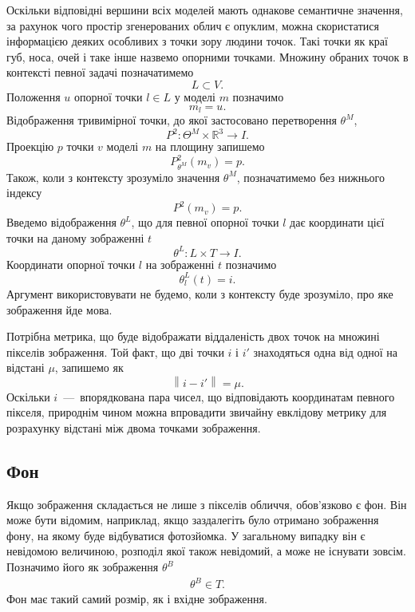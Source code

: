 Оскільки відповідні вершини всіх моделей мають однакове семантичне значення,
за рахунок чого простір згенерованих облич є опуклим,
можна скористатися інформацією деяких особливих з точки зору людини точок.
Такі точки як краї губ, носа, очей і таке інше назвемо опорними точками.
Множину обраних точок в контексті певної задачі позначатимемо
\begin{equation*}
  L \subset V.
\end{equation*}
Положення $u$ опорної точки $l \in L$ у моделі $m$ позначимо
\begin{equation*}
  m_{l} = u.
\end{equation*}
Відображення тривимірної точки,
до якої застосовано перетворення $\theta^M$,
\begin{equation*}
  P^2: \Theta^M \times \mathbb{R}^3 \rightarrow I.
\end{equation*}
Проекцію $p$ точки $v$ моделі $m$ на площину запишемо
\begin{equation*}
  P^2_{\theta^M}\left( m_v \right) = p.
\end{equation*}
Також, коли з контексту зрозуміло значення $\theta^M$,
позначатимемо без нижнього індексу
\begin{equation*}
  P^2\left( m_v \right) = p.
\end{equation*}
Введемо відображення $\theta^L$,
що для певної опорної точки $l$
дає координати цієї точки на даному зображенні $t$
\begin{equation*}
  \theta^L: L \times T \rightarrow I.
\end{equation*}
Координати опорної точки $l$ на зображенні $t$ позначимо
\begin{equation*}
  \theta_l^L\left( t \right) = i.
\end{equation*}
Аргумент використовувати не будемо, коли з контексту буде зрозуміло,
про яке зображення йде мова.

Потрібна метрика,
що буде відображати віддаленість двох точок на множині пікселів зображення.
Той факт,
що дві точки $i$ і $i'$ знаходяться одна від одної на відстані $\mu$,
запишемо як
\begin{equation*}
  \left\| i - i' \right\| = \mu.
\end{equation*}
Оскільки $i$~---~впорядкована пара чисел,
що відповідають координатам певного пікселя,
природнім чином можна впровадити звичайну евклідову метрику
для розрахунку відстані між двома точками зображення.

\subsection{Фон}
Якщо зображення складається не лише з пікселів обличчя,
обов'язково є фон.
Він може бути відомим, наприклад,
якщо заздалегіть було отримано зображення фону,
на якому буде відбуватися фотозйомка.
У загальному випадку він є невідомою величиною,
розподіл якої також невідомий,
а може не існувати зовсім.
Позначимо його як зображення $\theta^B$
\begin{align*}
  \theta^B \in T.
\end{align*}
Фон має такий самий розмір, як і вхідне зображення.

